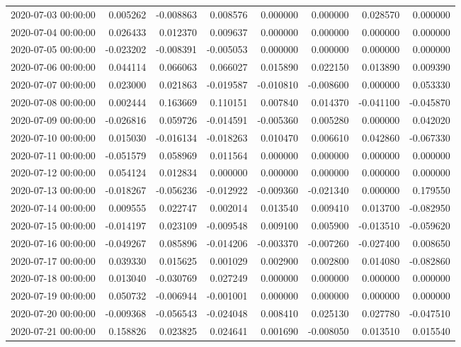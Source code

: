 \begin{tabular}{lrrrrrrr}
2020-07-03 00:00:00 & 0.005262 & -0.008863 & 0.008576 & 0.000000 & 0.000000 & 0.028570 & 0.000000 \\
2020-07-04 00:00:00 & 0.026433 & 0.012370 & 0.009637 & 0.000000 & 0.000000 & 0.000000 & 0.000000 \\
2020-07-05 00:00:00 & -0.023202 & -0.008391 & -0.005053 & 0.000000 & 0.000000 & 0.000000 & 0.000000 \\
2020-07-06 00:00:00 & 0.044114 & 0.066063 & 0.066027 & 0.015890 & 0.022150 & 0.013890 & 0.009390 \\
2020-07-07 00:00:00 & 0.023000 & 0.021863 & -0.019587 & -0.010810 & -0.008600 & 0.000000 & 0.053330 \\
2020-07-08 00:00:00 & 0.002444 & 0.163669 & 0.110151 & 0.007840 & 0.014370 & -0.041100 & -0.045870 \\
2020-07-09 00:00:00 & -0.026816 & 0.059726 & -0.014591 & -0.005360 & 0.005280 & 0.000000 & 0.042020 \\
2020-07-10 00:00:00 & 0.015030 & -0.016134 & -0.018263 & 0.010470 & 0.006610 & 0.042860 & -0.067330 \\
2020-07-11 00:00:00 & -0.051579 & 0.058969 & 0.011564 & 0.000000 & 0.000000 & 0.000000 & 0.000000 \\
2020-07-12 00:00:00 & 0.054124 & 0.012834 & 0.000000 & 0.000000 & 0.000000 & 0.000000 & 0.000000 \\
2020-07-13 00:00:00 & -0.018267 & -0.056236 & -0.012922 & -0.009360 & -0.021340 & 0.000000 & 0.179550 \\
2020-07-14 00:00:00 & 0.009555 & 0.022747 & 0.002014 & 0.013540 & 0.009410 & 0.013700 & -0.082950 \\
2020-07-15 00:00:00 & -0.014197 & 0.023109 & -0.009548 & 0.009100 & 0.005900 & -0.013510 & -0.059620 \\
2020-07-16 00:00:00 & -0.049267 & 0.085896 & -0.014206 & -0.003370 & -0.007260 & -0.027400 & 0.008650 \\
2020-07-17 00:00:00 & 0.039330 & 0.015625 & 0.001029 & 0.002900 & 0.002800 & 0.014080 & -0.082860 \\
2020-07-18 00:00:00 & 0.013040 & -0.030769 & 0.027249 & 0.000000 & 0.000000 & 0.000000 & 0.000000 \\
2020-07-19 00:00:00 & 0.050732 & -0.006944 & -0.001001 & 0.000000 & 0.000000 & 0.000000 & 0.000000 \\
2020-07-20 00:00:00 & -0.009368 & -0.056543 & -0.024048 & 0.008410 & 0.025130 & 0.027780 & -0.047510 \\
2020-07-21 00:00:00 & 0.158826 & 0.023825 & 0.024641 & 0.001690 & -0.008050 & 0.013510 & 0.015540 \\

\end{tabular}
